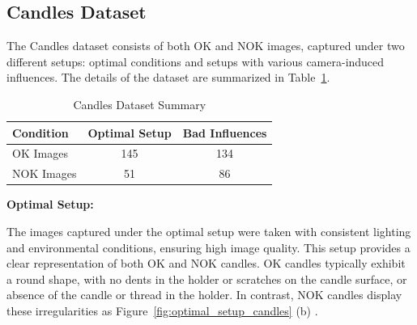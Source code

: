 \documentclass[12pt,DIV14,BCOR12mm,a4paper,footinclude=false,headinclude,parskip=half-,twoside,openright,cleardoublepage=empty,toc=index,bibliography=totoc,listof=totoc]{scrreprt}
\numberwithin{equation}{chapter}
\begin{document}
\subsection{Candles Dataset}
\label{sec:candles_dataset}
The Candles dataset consists of both OK and NOK images, captured under two different setups: optimal conditions and setups with various camera-induced influences. The details of the dataset are summarized in Table~\ref{tab:candles-dataset}.

\begin{table}
    \centering
    \caption{Candles Dataset Summary}
    \label{tab:candles-dataset}
    \begin{tabular}{lcc}
        \toprule
        \textbf{Condition} & \textbf{Optimal Setup} & \textbf{Bad Influences} \\ 
        \midrule
        OK Images          & 145                    & 134                     \\ 
        NOK Images         & 51                     & 86                      \\ 
        \bottomrule
    \end{tabular}
\end{table}



\textbf{Optimal Setup:}

The images captured under the optimal setup were taken with consistent lighting and environmental conditions, ensuring high image quality. This setup provides a clear representation of both OK and NOK candles. OK candles typically exhibit a round shape, with no dents in the holder or scratches on the candle surface, or absence of the candle or thread in the holder. In contrast, NOK candles display these irregularities as Figure~\ref{fig:optimal_setup_candles} (b) .
\end{document}
